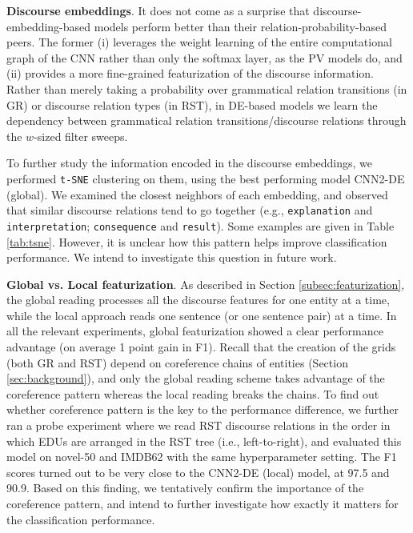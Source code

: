 \noindent
\textbf{Discourse embeddings}.
It does not come as a surprise that discourse-embedding-based models perform better than their relation-probability-based peers.
The former (i) leverages the weight learning of the entire computational graph of the CNN rather than only the softmax layer, as the PV models do, and (ii) provides a more fine-grained featurization of the discourse information. Rather than merely taking a probability over grammatical relation transitions (in GR) or discourse relation types (in RST), in DE-based models we learn the dependency between grammatical relation transitions/discourse relations through the $w$-sized filter sweeps. 

To further study the information encoded in the discourse embeddings, we performed \texttt{t-SNE} clustering \cite{vanDerMaaten:2008} on them, using the best performing model CNN2-DE (global). We examined the closest neighbors of each embedding, and observed that similar discourse relations tend to go together (e.g., \texttt{explanation} and \texttt{interpretation}; \texttt{consequence} and \texttt{result}). Some examples are given in Table \ref{tab:tsne}.
However, it is unclear how this pattern helps improve classification performance.
We intend to investigate this question in future work.
\medskip

\noindent
\textbf{Global vs. Local featurization}.
As described in Section \ref{subsec:featurization}, the global reading processes all the discourse features for one entity at a time, while the local approach reads one sentence (or one sentence pair) at a time.
In all the relevant experiments, global featurization showed a clear performance advantage (on average 1 point gain in F1). 
Recall that the creation of the grids (both GR and RST) depend on coreference chains of entities (Section \ref{sec:background}), and only the global reading scheme takes advantage of the coreference pattern whereas the local reading breaks the chains. 
To find out whether coreference pattern is the key to the performance difference, we further ran a probe experiment where we read RST discourse relations in the order in which EDUs are arranged in the RST tree (i.e., left-to-right), and evaluated this model on novel-50 and IMDB62 with the same hyperparameter setting. 
The F1 scores turned out to be very close to the CNN2-DE (local) model, at 97.5 and 90.9.
Based on this finding, we tentatively confirm the importance of the coreference pattern, and intend to further investigate how exactly it matters for the classification performance. 
\medskip

